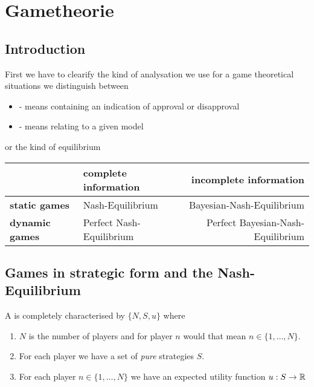 \chapter{Gametheorie}
\section*{Introduction}
First we have to clearify the kind of analysation we use for a game theoretical situations we distinguish between
\begin{itemize}
	\item {} - means containing an indication of approval or disapproval
	\item {} - means relating to a given model
\end{itemize}

or the kind of equilibrium

\begin{tabular}{|l|l|r|}
	\hline\hline
  			& {\textbf{complete information}} & {\textbf{incomplete information}} \\
                                                    \hline
   \textbf{static games} & Nash-Equilibrium & Bayesian-Nash-Equilibrium\arrayrulewidth2pt \\
                                               \cline{1-3}
   \textbf{dynamic games} & Perfect Nash-Equilibrium & Perfect Bayesian-Nash-Equilibrium \\ \hline\hline
\end{tabular}

\section{Games in strategic form and the Nash-Equilibrium}
A  is completely characterised by $\{ N, S, u \}$ where
	\begin{enumerate}
		\item $N$ is the number of players and for player $n$ would that mean $n \in \{ 1, \dotsc, N \}$.
		\item For each player we have a set of \textit{pure} strategies $S$.
		\item For each player $n \in \{1, \dotsc, N \}$ we have an expected utility function $u : S \rightarrow \mathbb{R}$
	\end{enumerate}

